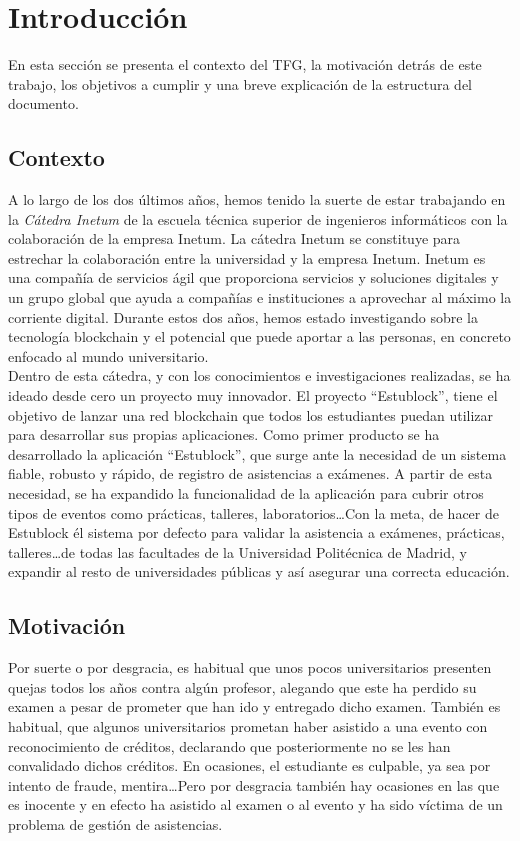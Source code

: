 \chapter{Introducción}
\label{cap:Introduccion}

En esta sección se presenta el contexto del TFG, la motivación detrás de este trabajo, los objetivos a cumplir y una breve explicación de la estructura del documento.

\section{Contexto}

A lo largo de los dos últimos años, hemos tenido la suerte de estar trabajando en la \emph{Cátedra Inetum} de la escuela técnica superior de ingenieros informáticos con la colaboración de la empresa Inetum. La cátedra Inetum se constituye para estrechar la colaboración entre la universidad y la empresa Inetum. Inetum es una compañía de servicios ágil que proporciona servicios y soluciones digitales y un grupo global que ayuda a compañías e instituciones a aprovechar al máximo la corriente digital. Durante estos dos años, hemos estado investigando sobre la tecnología blockchain y el potencial que puede aportar a las personas, en concreto enfocado al mundo universitario. \\

Dentro de esta cátedra, y con los conocimientos e investigaciones realizadas, se ha ideado desde cero un proyecto muy innovador. El proyecto ``Estublock'', tiene el objetivo de lanzar una red blockchain que todos los estudiantes puedan utilizar para desarrollar sus propias aplicaciones. Como primer producto se ha desarrollado la aplicación ``Estublock'', que surge ante la necesidad de un sistema fiable, robusto y rápido, de registro de asistencias a exámenes. A partir de esta necesidad, se ha expandido la funcionalidad de la aplicación para cubrir otros tipos de eventos como prácticas, talleres, laboratorios\dots Con la meta, de hacer de Estublock él sistema por defecto para validar la asistencia a exámenes, prácticas, talleres\dots de todas las facultades de la Universidad Politécnica de Madrid, y expandir al resto de universidades públicas y así asegurar una correcta educación.

\section{Motivación}

  Por suerte o por desgracia, es habitual que unos pocos universitarios presenten quejas todos los años contra algún profesor, alegando que este ha perdido su examen a pesar de prometer que han ido y entregado dicho examen. También es habitual, que algunos universitarios prometan haber asistido a una evento con reconocimiento de créditos, declarando que posteriormente no se les han convalidado dichos créditos. En ocasiones, el estudiante es culpable, ya sea por intento de fraude, mentira\dots Pero por desgracia también hay ocasiones en las que es inocente y en efecto ha asistido al examen o al evento y ha sido víctima de un problema de gestión de asistencias. \\

